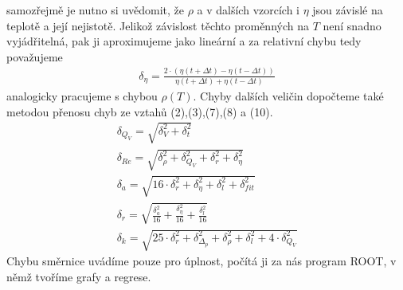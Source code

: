 \documentclass[a4paper]{article}
\begin{document}
samozřejmě je nutno si uvědomit, že $\rho$ a v dalších vzorcích i $\eta$ jsou závislé na teplotě a její nejistotě. Jelikož závislost těchto proměnných na $T$ není snadno vyjádřitelná, pak ji aproximujeme jako lineární a za relativní chybu tedy považujeme
\begin{align}
\delta_{\eta} = \frac{2 \cdot (\eta(t+\Delta t) - \eta(t-\Delta t))}{\eta(t+\Delta t) + \eta(t-\Delta t)}
\end{align}
analogicky pracujeme s chybou $\rho(T)$. Chyby dalších veličin dopočteme také metodou přenosu chyb ze vztahů (2),(3),(7),(8) a (10).
\begin{align}
\delta_{Q_{V}} = \sqrt{\delta^{2}_{V} + \delta^{2}_{t}}\\
\delta_{Re} = \sqrt{\delta^{2}_{\rho} + \delta^{2}_{Q_{V}} + \delta^{2}_{r} + \delta^{2}_{\eta}}\\
\delta_{a} = \sqrt{16 \cdot \delta^{2}_{r} + \delta^{2}_{\eta} + \delta^{2}_{l} + \delta^{2}_{fit}}\\
\delta_{r} = \sqrt{{\frac{\delta^{2}_{a}}{16}} + {\frac{\delta^{2}_{\eta}}{16}} + {\frac{\delta^{2}_{l}}{16}}} \\
\delta_{k} = \sqrt{25 \cdot \delta^{2}_{r} + \delta^{2}_{\Delta_{p}} + \delta^{2}_{\rho} + \delta^{2}_{l} + 4 \cdot \delta^{2}_{Q_{V}}}
\end{align}
Chybu směrnice uvádíme pouze pro úplnost, počítá ji za nás program ROOT, v němž tvoříme grafy a regrese.
\end{document}
